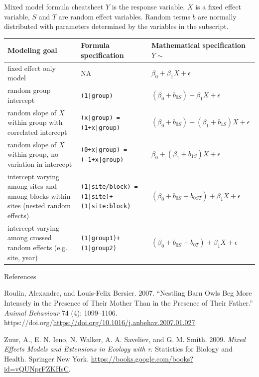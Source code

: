 \documentclass[
  ignorenonframetext,
]{beamer}
\newlength{\cslhangindent}
\newlength{\cslentryspacingunit} %
\newenvironment{CSLReferences}[2] %
 {%
  \setlength{\parindent}{0pt}
  \ifodd #1
  \let\oldpar\par
  \def\par{\hangindent=\cslhangindent\oldpar}
  \fi
  \setlength{\parskip}{#2\cslentryspacingunit}
 }%
 {}
\begin{document}
\begin{frame}{Mixed model formula cheatsheet}
\protect\hypertarget{mixed-model-formula-cheatsheet}{}
\(Y\) is the response variable, \(X\) is a fixed effect variable, \(S\)
and \(T\) are random effect variables. Random terms \(b\) are normally
distributed with parameters determined by the variables in the
subscript.

\scriptsize
\begin{tabular}{p{3.5cm}|p{3.5cm}|p{3.5cm}}
Modeling goal & Formula specification & Mathematical specification $Y\sim$ \\
\hline
fixed effect only model & NA & $\beta_0 + \beta_1X + \epsilon$\\
random group intercept & \texttt{(1|group)} & $(\beta_0 + b_{0S}) + \beta_1X + \epsilon$\\
random slope of $X$ within group with correlated intercept & \texttt{(x|group) = (1+x|group)} 
& $(\beta_0 + b_{0S}) +  (\beta_1 + b_{1S}) X + \epsilon$\\
random slope of $X$ within group, no variation in intercept & \texttt{(0+x|group) = (-1+x|group)} 
& $\beta_0  +  (\beta_1 + b_{1S}) X + \epsilon$\\
intercept varying among sites and among blocks within sites (nested random effects) 
& \texttt{(1|site/block) = (1|site)+(1|site:block)} 
&  $(\beta_0 + b_{0S} + b_{0ST}) + \beta_1X + \epsilon$\\
intercept varying among crossed random effects (e.g. site, year) 
& \texttt{(1|group1)+(1|group2)} & $(\beta_0 + b_{0S} + b_{0T}) + \beta_1X + \epsilon$

\end{tabular}
\end{frame}

\begin{frame}{References}
\protect\hypertarget{references}{}
\hypertarget{refs}{}
\begin{CSLReferences}{1}{0}
\leavevmode{}%
Roulin, Alexandre, and Louis-Felix Bersier. 2007. {``Nestling Barn Owls
Beg More Intensely in the Presence of Their Mother Than in the Presence
of Their Father.''} \emph{Animal Behaviour} 74 (4): 1099--1106.
https://doi.org/\url{https://doi.org/10.1016/j.anbehav.2007.01.027}.

\leavevmode{}%
Zuur, A., E. N. Ieno, N. Walker, A. A. Saveliev, and G. M. Smith. 2009.
\emph{Mixed Effects Models and Extensions in Ecology with r}. Statistics
for Biology and Health. Springer New York.
\url{https://books.google.com/books?id=vQUNprFZKHsC}.

\end{CSLReferences}
\end{frame}
\end{document}
